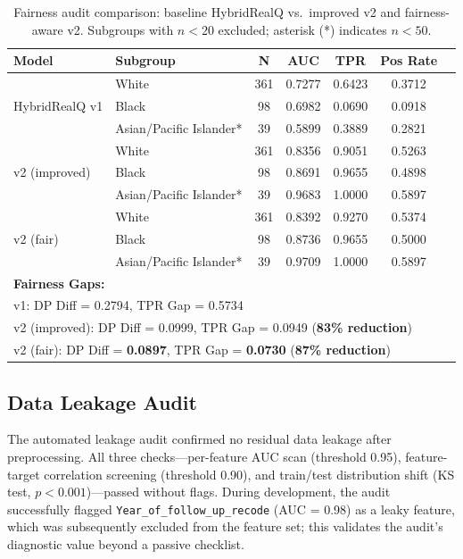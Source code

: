 \documentclass[12pt, letterpaper]{article}
\begin{document}
\begin{table}[h!]
\centering
\caption{Fairness audit comparison: baseline HybridRealQ vs.\ improved v2 and fairness-aware v2. Subgroups with $n < 20$ excluded; asterisk (*) indicates $n < 50$.}
\label{tab:fairness}
\begin{tabular}{@{}llccccc@{}}
\toprule
\textbf{Model} & \textbf{Subgroup} & \textbf{N} & \textbf{AUC} & \textbf{TPR} & \textbf{Pos Rate} \\
\midrule
\multirow{3}{*}{HybridRealQ v1}
  & White                     & 361 & 0.7277 & 0.6423 & 0.3712 \\
  & Black                     & 98  & 0.6982 & 0.0690 & 0.0918 \\
  & Asian/Pacific Islander*   & 39  & 0.5899 & 0.3889 & 0.2821 \\
\midrule
\multirow{3}{*}{v2 (improved)}
  & White                     & 361 & 0.8356 & 0.9051 & 0.5263 \\
  & Black                     & 98  & 0.8691 & 0.9655 & 0.4898 \\
  & Asian/Pacific Islander*   & 39  & 0.9683 & 1.0000 & 0.5897 \\
\midrule
\multirow{3}{*}{v2 (fair)}
  & White                     & 361 & 0.8392 & 0.9270 & 0.5374 \\
  & Black                     & 98  & 0.8736 & 0.9655 & 0.5000 \\
  & Asian/Pacific Islander*   & 39  & 0.9709 & 1.0000 & 0.5897 \\
\midrule
\multicolumn{6}{l}{\small \textbf{Fairness Gaps:}} \\
\multicolumn{6}{l}{\small \quad v1: DP Diff = 0.2794, TPR Gap = 0.5734} \\
\multicolumn{6}{l}{\small \quad v2 (improved): DP Diff = 0.0999, TPR Gap = 0.0949 (\textbf{83\% reduction})} \\
\multicolumn{6}{l}{\small \quad v2 (fair): DP Diff = \textbf{0.0897}, TPR Gap = \textbf{0.0730} (\textbf{87\% reduction})} \\
\bottomrule
\end{tabular}
\end{table}

\subsection{Data Leakage Audit}
The automated leakage audit confirmed no residual data leakage after preprocessing. All three checks---per-feature AUC scan (threshold 0.95), feature-target correlation screening (threshold 0.90), and train/test distribution shift (KS test, $p < 0.001$)---passed without flags. During development, the audit successfully flagged \texttt{Year\_of\_follow\_up\_recode} (AUC = 0.98) as a leaky feature, which was subsequently excluded from the feature set; this validates the audit's diagnostic value beyond a passive checklist.
\end{document}
